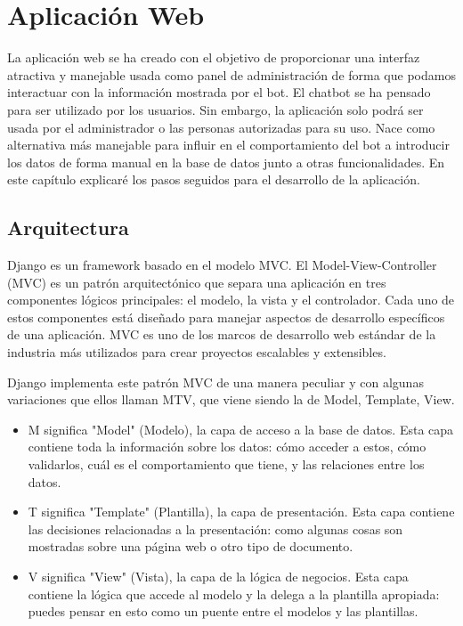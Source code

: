 \chapter{Aplicación Web}

La aplicación web se ha creado con el objetivo de proporcionar una interfaz atractiva y manejable usada como panel de administración de forma que podamos interactuar con la información mostrada por el bot. El chatbot se ha pensado para ser utilizado por los usuarios. Sin embargo, la aplicación solo podrá ser usada por el administrador o las personas autorizadas para su uso. Nace como alternativa más manejable para influir en el comportamiento del bot a introducir los datos de forma manual en la base de datos junto a otras funcionalidades. En este capítulo explicaré los pasos seguidos para el desarrollo de la aplicación. \vspace{0.3cm}


\section{Arquitectura} 


Django es un framework basado en el modelo  MVC. El Model-View-Controller (MVC) es un patrón arquitectónico que separa una aplicación en tres componentes lógicos principales: el modelo, la vista y el controlador. Cada uno de estos componentes está diseñado para manejar aspectos de desarrollo específicos de una aplicación. MVC es uno de los marcos de desarrollo web estándar de la industria más utilizados para crear proyectos escalables y extensibles.

Django implementa este patrón MVC de una manera peculiar y con algunas variaciones que ellos llaman MTV, que viene siendo la de Model, Template, View.

\begin{itemize}

\item M significa "Model" (Modelo), la capa de acceso a la base de datos. Esta capa contiene toda la información sobre los datos: cómo acceder a estos, cómo validarlos, cuál es el comportamiento que tiene, y las relaciones entre los datos.

\item T significa "Template" (Plantilla), la capa de presentación. Esta capa contiene las decisiones relacionadas a la presentación: como algunas cosas son mostradas sobre una página web o otro tipo de documento.

\item V significa "View" (Vista), la capa de la lógica de negocios. Esta capa contiene la lógica que accede al modelo y la delega a la plantilla apropiada: puedes pensar en esto como un puente entre el modelos y las plantillas.

\end{itemize}

